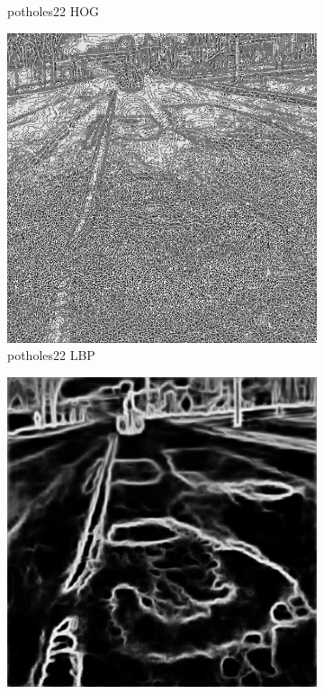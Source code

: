 \documentclass[a4paper, 10pt]{article}
\begin{document}
\begin{figure}[htbp]
\begin{subfigure}{0.24\textwidth}
			\caption*{potholes22 HOG}
			\label{fig: potholes22 HOG}
		\end{subfigure}	
		\begin{subfigure}{0.24\textwidth}
			\includegraphics[width=\linewidth]{picture/alldata_lbp/potholes22}
			\caption*{potholes22 LBP}
			\label{fig: potholes22 LBP}
		\end{subfigure}
		\begin{subfigure}{0.24\textwidth}
			\includegraphics[width=\linewidth]{picture/alldata_edge/potholes22}

\end{subfigure}
\end{figure}
\end{document}
